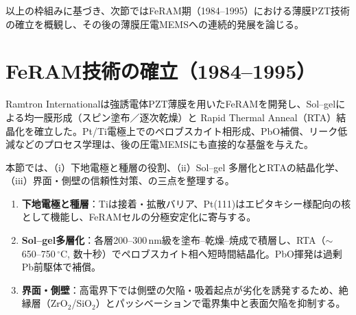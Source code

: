 \documentclass[conference]{IEEEtran}
\begin{document}
以上の枠組みに基づき、次節ではFeRAM期（1984--1995）における薄膜PZT技術の確立を概観し、その後の薄膜圧電MEMSへの連続的発展を論じる。

\section{FeRAM技術の確立（1984--1995）}
Ramtron Internationalは強誘電体PZT薄膜を用いたFeRAMを開発し、Sol--gelによる均一膜形成（スピン塗布／逐次乾燥）と Rapid Thermal Anneal（RTA）結晶化を確立した\cite{ramtron_iedm1989,bottaro1993solgel}。Pt/Ti電極上でのペロブスカイト相形成、PbO補償、リーク低減などのプロセス学理は、後の圧電MEMSにも直接的な基盤を与えた\cite{scott2000review}。

本節では、（i）下地電極と種層の役割、（ii）Sol--gel 多層化とRTAの結晶化学、（iii）界面・側壁の信頼性対策、の三点を整理する。
\begin{enumerate}
  \item \textbf{下地電極と種層}：Tiは接着・拡散バリア、Pt(111)はエピタキシー様配向の核として機能し、FeRAMセルの分極安定化に寄与する。
  \item \textbf{Sol--gel多層化}：各層200--300\,nm級を塗布–乾燥–焼成で積層し、RTA（$\sim$650--750\,$^\circ$C, 数十秒）でペロブスカイト相へ短時間結晶化。PbO揮発は過剰Pb前駆体で補償。
  \item \textbf{界面・側壁}：高電界下では側壁の欠陥・吸着起点が劣化を誘発するため、絶縁層（ZrO$_2$/SiO$_2$）とパッシベーションで電界集中と表面欠陥を抑制する。
\end{enumerate}
\end{document}
